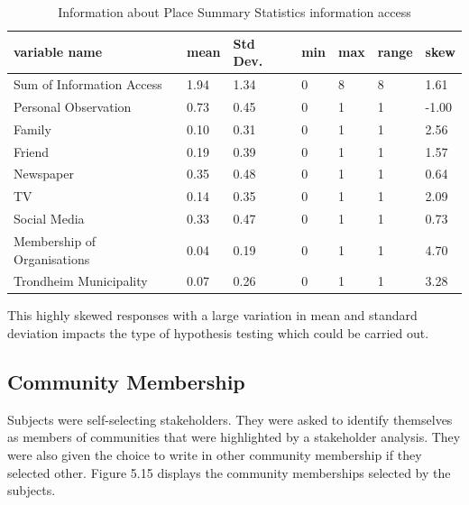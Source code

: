 \begin{center}
\begin{table}[H]
    \centering
    \begin{tabular}{|l|l|l|l|l|l|l|}
    \hline
        variable name & mean & Std Dev. & min & max & range & skew  \\ \hline
        Sum of Information Access & 1.94 & 1.34 & 0 & 8 & 8 & 1.61 \\ \hline
        Personal Observation & 0.73 & 0.45 & 0 & 1 & 1 & -1.00  \\ \hline
        Family & 0.10 & 0.31 & 0 & 1 & 1 & 2.56 \\ \hline
        Friend & 0.19 & 0.39 & 0 & 1 & 1 & 1.57  \\ \hline
        Newspaper & 0.35 & 0.48 & 0 & 1 & 1 & 0.64  \\ \hline
        TV & 0.14 & 0.35 & 0 & 1 & 1 & 2.09 \\ \hline
       Social Media & 0.33 & 0.47 & 0 & 1 & 1 & 0.73  \\ \hline
        Membership of Organisations & 0.04 & 0.19 & 0 & 1 & 1 & 4.70 \\ \hline
        Trondheim Municipality & 0.07 & 0.26 & 0 & 1 & 1 & 3.28\\ \hline
                
         \end{tabular}
    \caption{Information about Place Summary Statistics information access}
\label{table:summary_stats_info_access}
\end{table}
\end{center}

This highly skewed responses with a large variation in mean and standard deviation impacts the type of hypothesis testing which could be carried out. 

\subsection{Community Membership}
Subjects were self-selecting stakeholders.  They were asked to identify themselves as members of communities that were highlighted by a stakeholder analysis. They were also given the choice to write in other community membership if they selected other. Figure 5.15 displays the community memberships selected by the subjects. 

